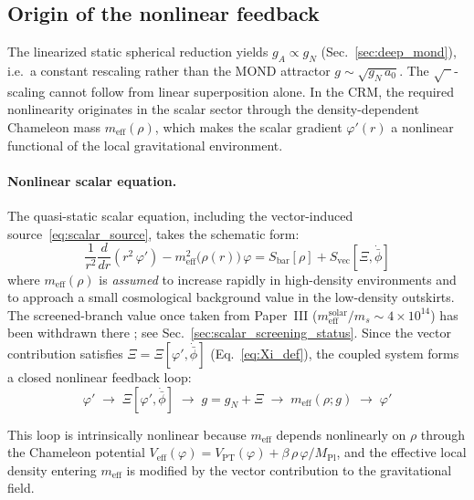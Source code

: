 \documentclass[aps,prd,twocolumn,superscriptaddress,nofootinbib]{revtex4-2}
\begin{document}
\subsection{Origin of the nonlinear feedback}
\label{sec:nonlinear_origin}

The linearized static spherical reduction yields $g_A \propto g_N$ (Sec.~\ref{sec:deep_mond}), i.e.\ a constant rescaling rather than the MOND attractor $g \sim \sqrt{g_N\,a_0}$. The $\sqrt{\phantom{x}}$-scaling cannot follow from linear superposition alone. In the CRM, the required nonlinearity originates in the scalar sector through the density-dependent Chameleon mass $m_{\mathrm{eff}}(\rho)$, which makes the scalar gradient $\varphi'(r)$ a nonlinear functional of the local gravitational environment.

\paragraph{Nonlinear scalar equation.}
The quasi-static scalar equation, including the vector-induced source~\eqref{eq:scalar_source}, takes the schematic form:
\begin{equation}
\frac{1}{r^2}\frac{d}{dr}\!\left(r^2\,\varphi'\right) - m_{\mathrm{eff}}^2\!\big(\rho(r)\big)\,\varphi = S_{\mathrm{bar}}[\rho] + S_{\mathrm{vec}}[\Xi, \dot{\bar{\phi}}]
\label{eq:scalar_chameleon}
\end{equation}
where $m_{\mathrm{eff}}(\rho)$ is \textit{assumed} to increase rapidly in high-density environments and to approach a small cosmological background value in the low-density outskirts. The screened-branch value once taken from Paper~III ($m_{\mathrm{eff}}^{\mathrm{solar}}/m_s \sim 4 \times 10^{14}$) has been withdrawn there \cite{Geiger2026c}; see Sec.~\ref{sec:scalar_screening_status}. Since the vector contribution satisfies $\Xi = \Xi[\varphi', \dot{\bar{\phi}}]$ (Eq.~\ref{eq:Xi_def}), the coupled system forms a closed nonlinear feedback loop:
\begin{equation}
\varphi' \;\longrightarrow\; \Xi[\varphi', \dot{\bar{\phi}}] \;\longrightarrow\; g = g_N + \Xi \;\longrightarrow\; m_{\mathrm{eff}}(\rho; g) \;\longrightarrow\; \varphi'
\label{eq:feedback_loop}
\end{equation}

This loop is intrinsically nonlinear because $m_{\mathrm{eff}}$ depends nonlinearly on $\rho$ through the Chameleon potential $V_{\mathrm{eff}}(\varphi) = V_{\mathrm{PT}}(\varphi) + \beta\,\rho\,\varphi/M_{\mathrm{Pl}}$, and the effective local density entering $m_{\mathrm{eff}}$ is modified by the vector contribution to the gravitational field.
\end{document}

